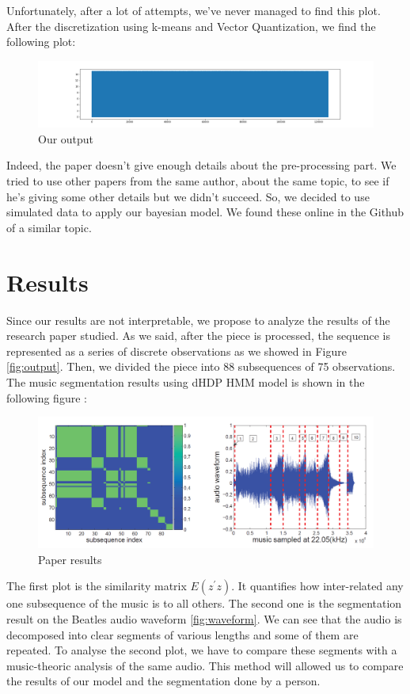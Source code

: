 Unfortunately, after a lot of attempts, we've never managed to find this plot. After the discretization using k-means and Vector Quantization, we find the following plot:
\begin{figure}[h]
    \centering
  	\includegraphics[scale=0.25]{Graphics/ouroutput.PNG} 
   	\caption{Our output}
\end{figure}

Indeed, the paper doesn't give enough details about the pre-processing part. We tried to use other papers from the same author, about the same topic, to see if he's giving some other details but we didn't succeed. So, we decided to use simulated data to apply our bayesian model. We found these online in the Github of a similar topic.

\section{Results}
Since our results are not interpretable, we propose to analyze the results of the research paper studied. As we said, after the piece is processed, the sequence is represented as a series of discrete observations as we showed in Figure \ref{fig:output}. Then, we divided the piece into 88 subsequences of 75 observations. The music segmentation results using dHDP HMM model is shown in the following figure : 
\begin{figure}[h]
    \centering
  	\includegraphics[scale=0.32]{Graphics/results.PNG} 
   	\caption{Paper results}
\end{figure}

The first plot is the similarity matrix $E(z^{'}z)$. It quantifies how inter-related any one subsequence of the music is to all others. The second one is the segmentation result on the Beatles audio waveform \ref{fig:waveform}. We can see that the audio is decomposed into clear segments of various lengths and some of them are repeated. To analyse the second plot, we have to compare these segments with a music-theoric analysis of the same audio. This method will allowed us to compare the results of our model and the segmentation done by a person.

